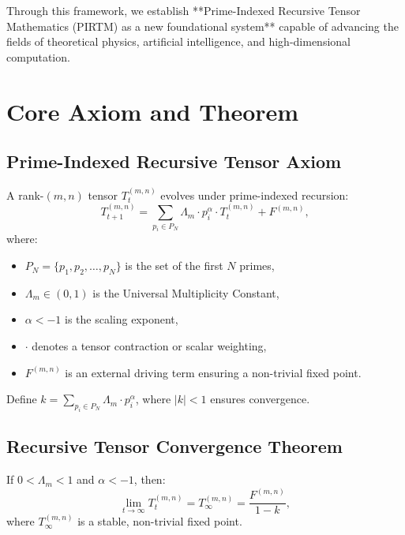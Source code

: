 \documentclass{article}
\theoremstyle{plain}
\begin{document}
\noindent Through this framework, we establish **Prime-Indexed Recursive Tensor Mathematics (PIRTM) as a new foundational system** capable of advancing the fields of theoretical physics, artificial intelligence, and high-dimensional computation.


\section{Core Axiom and Theorem}
\subsection{Prime-Indexed Recursive Tensor Axiom}
A rank-$(m,n)$ tensor \( T_t^{(m,n)} \) evolves under prime-indexed recursion:
\begin{equation}
T_{t+1}^{(m,n)} = \sum_{p_i \in P_N} \Lambda_m \cdot p_i^\alpha \cdot T_t^{(m,n)} + F^{(m,n)},
\label{eq:pirtm_axiom}
\end{equation}
where:
\begin{itemize}
    \item \( P_N = \{p_1, p_2, \dots, p_N\} \) is the set of the first \( N \) primes,
    \item \( \Lambda_m \in (0, 1) \) is the Universal Multiplicity Constant,
    \item \( \alpha < -1 \) is the scaling exponent,
    \item \( \cdot \) denotes a tensor contraction or scalar weighting,
    \item \( F^{(m,n)} \) is an external driving term ensuring a non-trivial fixed point.
\end{itemize}
Define \( k = \sum_{p_i \in P_N} \Lambda_m \cdot p_i^\alpha \), where \( |k| < 1 \) ensures convergence.

\subsection{Recursive Tensor Convergence Theorem}
If \( 0 < \Lambda_m < 1 \) and \( \alpha < -1 \), then:
\begin{equation}
\lim_{t \to \infty} T_t^{(m,n)} = T_\infty^{(m,n)} = \frac{F^{(m,n)}}{1 - k},
\label{eq:pirtm_theorem}
\end{equation}
where \( T_\infty^{(m,n)} \) is a stable, non-trivial fixed point.
\end{document}
